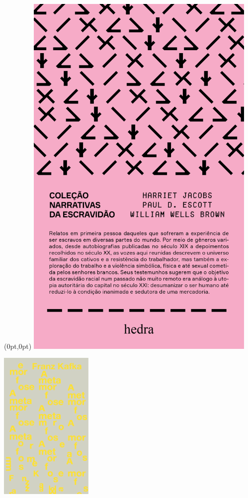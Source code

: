 \pagestyle{hedra}
\label{hedra}

\begin{textblock*}{5.625in}(0pt,0pt)%
\vspace*{-1.45cm}
\hspace*{-1.2cm}\includegraphics*[width=112mm]{./imgs/HEDRA.png}
\end{textblock*}

\pagebreak


\hspace{.5cm}

\begin{center}
\hspace*{-.5cm}\includegraphics[width=45mm]{./imgs/kafka.png}
\end{center}

